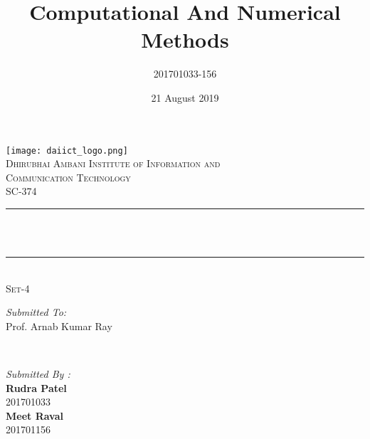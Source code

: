 \documentclass[a4paper]{article}
\title{Computational And Numerical Methods}      %
\author{201701033-156}                           %
\date{21 August  2019}                           %
\makeatletter
\let\thetitle\@title
\makeatother
\begin{document}

\begin{titlepage}
    \centering
    \vspace*{0.5 cm}
    \texttt{[image: daiict\_logo.png]}\\[1.0 cm]    %
    \textsc{\LARGE Dhirubhai Ambani Institute of Information and }\\[0.8 cm]
    \textsc{\LARGE Communication Technology}\\[2.0 cm]    %
    \textsc{\Large SC-374}\\[0.5 cm]                %
    \rule{\linewidth}{0.2 mm} \\[0.4 cm]
    { \huge \bfseries \thetitle}\\
    \rule{\linewidth}{0.2 mm} \\[0.4 cm]
    \textsc{\Large Set-4}\\[0.5 cm]
    \begin{minipage}{0.4\textwidth} 
        \begin{flushleft} \large
            \emph{Submitted To:}\\
            Prof. Arnab Kumar Ray\\

            \end{flushleft}
            \end{minipage}~
            \begin{minipage}{0.4\textwidth}
            
            \begin{flushright} \large
            \emph{Submitted By :} \\
        \Large\textbf{Rudra Patel}\\
            201701033 \\
    \Large\textbf{Meet Raval}\\
    201701156\\
        \end{flushright}
        
    \end{minipage}\\[2 cm]
\end{titlepage}
\tableofcontents
\pagebreak

\end{document}
